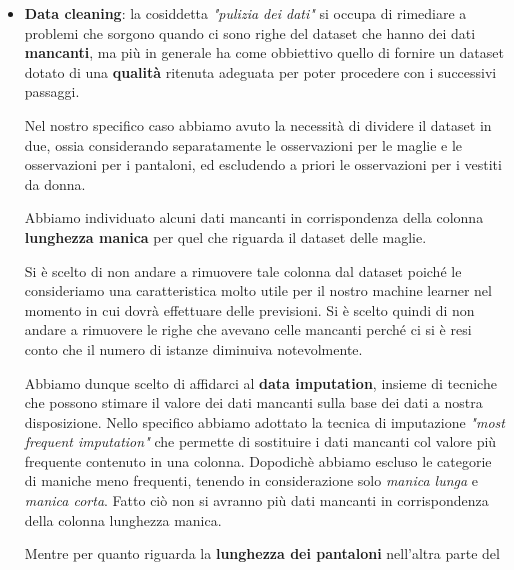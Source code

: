 \documentclass[a4paper, 11pt, oneside]{report}
\begin{document}
                \begin{itemize}
                    \item \textbf{Data cleaning}: la cosiddetta \textit{"pulizia dei dati"} si occupa di
                    rimediare a problemi che sorgono quando ci sono righe del dataset che hanno dei dati \textbf{mancanti}, ma più
                    in generale ha come obbiettivo quello di fornire un dataset dotato di una \textbf{qualità} ritenuta adeguata
                    per poter procedere con i successivi passaggi.
                    \par \noindent Nel nostro specifico caso abbiamo avuto la necessità di dividere il dataset \cite{6} in
                    due, ossia considerando separatamente le osservazioni per le maglie e le osservazioni per i pantaloni,
                    ed escludendo a priori le osservazioni per i vestiti da donna.
                    \par \noindent Abbiamo individuato alcuni dati mancanti in corrispondenza della
                    colonna \textbf{lunghezza manica} per quel che riguarda il dataset delle maglie.
                    \par \noindent Si è scelto di non andare a rimuovere tale colonna dal dataset poiché le consideriamo una caratteristica
                    molto utile per il nostro machine learner nel momento in cui dovrà effettuare delle previsioni.
                    Si è scelto quindi di non andare a rimuovere le righe che avevano celle mancanti
                    perché ci si è resi conto che il numero di istanze diminuiva notevolmente.
                    \par \noindent Abbiamo dunque scelto di affidarci al \textbf{data imputation}, insieme di tecniche che
                    possono stimare il valore dei dati mancanti sulla base dei dati a nostra disposizione.
                    Nello specifico abbiamo adottato la tecnica di imputazione \textit{"most frequent imputation"} che permette
                    di sostituire i dati mancanti col valore più frequente contenuto in una colonna. Dopodichè abbiamo
                    escluso le categorie di maniche meno frequenti, tenendo in considerazione solo \textit{manica lunga} e
                    \textit{manica corta}.
                    Fatto ciò non si avranno più dati mancanti in corrispondenza della colonna lunghezza manica.
                    \par \noindent Mentre per quanto riguarda la \textbf{lunghezza dei pantaloni} nell'altra parte del

\end{itemize}
\end{document}
